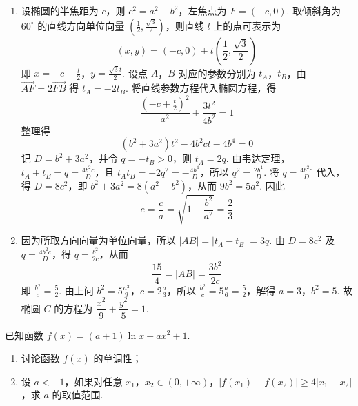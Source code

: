 \begin{solution}
\begin{enumerate}
\item 设椭圆的半焦距为 \(c\)，则 \(c^2=a^2-b^2\)，左焦点为 \(F=(-c,0)\). 取倾斜角为 \(60^{\circ}\) 的直线方向单位向量 \(\left(\frac{1}{2},\frac{\sqrt{3}}{2}\right)\)，则直线 \(l\) 上的点可表示为
\[
(x,y)=\left(-c,0\right)+t\left(\frac{1}{2},\frac{\sqrt{3}}{2}\right)
\]
即 \(x=-c+\frac{t}{2}\)，\(y=\frac{\sqrt{3}t}{2}\). 设点 \(A\)，\(B\) 对应的参数分别为 \(t_A\)，\(t_B\)，由 \(\overrightarrow{AF}=2\overrightarrow{FB}\) 得 \(t_A=-2t_B\). 将直线参数方程代入椭圆方程，得
\[
\frac{\left(-c+\frac{t}{2}\right)^2}{a^2}+\frac{3t^2}{4b^2}=1
\]
整理得
\[
\left(b^2+3a^2\right)t^2-4b^2ct-4b^4=0
\]
记 \(D=b^2+3a^2\)，并令 \(q=-t_B>0\)，则 \(t_A=2q\). 由韦达定理，\(t_A+t_B=q=\frac{4b^2c}{D}\)，且 \(t_At_B=-2q^2=-\frac{4b^4}{D}\)，所以 \(q^2=\frac{2b^4}{D}\). 将 \(q=\frac{4b^2c}{D}\) 代入，得 \(D=8c^2\)，即 \(b^2+3a^2=8(a^2-b^2)\)，从而 \(9b^2=5a^2\). 因此
\[
e=\frac{c}{a}=\sqrt{1-\frac{b^2}{a^2}}=\frac{2}{3}
\]
\item 因为所取方向向量为单位向量，所以 \(|AB|=|t_A-t_B|=3q\). 由 \(D=8c^2\) 及 \(q=\frac{4b^2c}{D}\)，得 \(q=\frac{b^2}{2c}\)，从而
\[
\frac{15}{4}=|AB|=\frac{3b^2}{2c}
\]
即 \(\frac{b^2}{c}=\frac{5}{2}\). 由上问 \(b^2=5\frac{a^2}{9}\)，\(c=2\frac{a}{3}\)，所以 \(\frac{b^2}{c}=5\frac{a}{6}=\frac{5}{2}\)，解得 \(a=3\)，\(b^2=5\). 故椭圆 \(C\) 的方程为 \(\dfrac{x^2}{9}+\dfrac{y^2}{5}=1\).
\end{enumerate}
\end{solution}

\begin{problem}
已知函数 \( f(x) = (a + 1)\ln x + ax^2 + 1 \).

\begin{enumerate}
\item 讨论函数 \( f(x) \) 的单调性；
\item 设 \(a < -1\)，如果对任意 \(x_{1}\)，\(x_{2} \in (0, +\infty)\)，\(|f(x_{1}) - f(x_{2})| \geqslant 4|x_{1} - x_{2}|\)，求 \(a\) 的取值范围.
\end{enumerate}
\end{problem}

